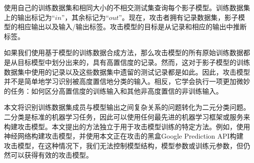 \documentclass[a4paper]{article}
\begin{document}
使用自己的训练数据集和相同大小的不相交测试集查询每个影子模型。训练数据集上的输出标记为$“in”$，其余标记为$“out”$。现在，攻击者拥有记录数据集，影子模型的相应输出以及输入/输出标签。攻击模型的目标是从记录和相应的输出中推断标签。

如果我们使用基于模型的训练数据合成方法，那么攻击模型的所有原始训练数据都是从目标模型中划分出来的，具有高置信度的记录。然而，这对于影子模型的训练数据集中使用的记录以及这些数据集中遗留的测试记录都是如此。因此，攻击模型并不是简单地学习识别被高度置信地分类的输入。相反，它学会执行一项更加微妙的任务：如何区分高置信度的训练输入和其他非高度置信的非训练输入。

本文将识别训练数据集成员与模型输出之间复杂关系的问题转化为二元分类问题。二分类是标准的机器学习任务，因此可以使用任何最先进的机器学习框架或服务来构建攻击模型。本文提出的方法独立于用于攻击模型训练的特定方法。例如，使用神经网络构建攻击模型，并使用本文正在攻击的黑盒Google Prediction API构建攻击模型，在这种情况下，我们无法控制模型结构，模型参数或训练元参数，但仍然可以获得有效的攻击模型。

\newpage


\end{document}

